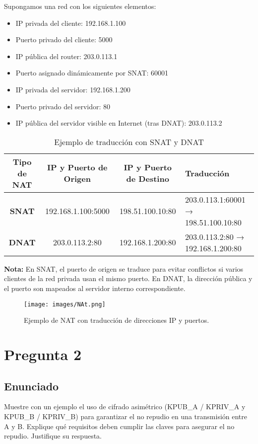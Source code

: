 \documentclass[12pt]{article}
\begin{document}
Supongamos una red con los siguientes elementos:
\begin{itemize}
    \item IP privada del cliente: 192.168.1.100
    \item Puerto privado del cliente: 5000
    \item IP pública del router: 203.0.113.1
    \item Puerto asignado dinámicamente por SNAT: 60001
    \item IP privada del servidor: 192.168.1.200
    \item Puerto privado del servidor: 80
    \item IP pública del servidor visible en Internet (tras DNAT): 203.0.113.2
\end{itemize}

\begin{table}[H]
    \centering
    \begin{tabular}{|c|c|c|p{5cm}|}
        \hline
        \textbf{Tipo de NAT} & \textbf{IP y Puerto de Origen} & \textbf{IP y Puerto de Destino} & \textbf{Traducción}\\
        \hline
        \textbf{SNAT} & 192.168.1.100:5000 & 198.51.100.10:80 & 203.0.113.1:60001 → 198.51.100.10:80\\
        \hline
        \textbf{DNAT} & 203.0.113.2:80 & 192.168.1.200:80 & 203.0.113.2:80 → 192.168.1.200:80\\
        \hline
    \end{tabular}
    \caption{Ejemplo de traducción con SNAT y DNAT}
\end{table}

\textbf{Nota:} En SNAT, el puerto de origen se traduce para evitar conflictos si varios clientes de la red privada usan el mismo puerto. En DNAT, la dirección pública y el puerto son mapeados al servidor interno correspondiente.

\begin{figure}[H]
    \centering
    \texttt{[image: images/NAt.png]}
    \caption{Ejemplo de NAT con traducción de direcciones IP y puertos.}
\end{figure}


\section{Pregunta 2}

\subsection{Enunciado}
Muestre con un ejemplo el uso de cifrado asimétrico (KPUB\_A / KPRIV\_A y KPUB\_B / KPRIV\_B) para garantizar el no repudio en una transmisión entre A y B. Explique qué requisitos deben cumplir las claves para asegurar el no repudio. Justifique su respuesta.
\end{document}
